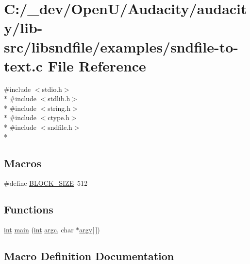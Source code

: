 \hypertarget{sndfile-to-text_8c}{}\section{C\+:/\+\_\+dev/\+Open\+U/\+Audacity/audacity/lib-\/src/libsndfile/examples/sndfile-\/to-\/text.c File Reference}
\label{sndfile-to-text_8c}
{\ttfamily \#include $<$stdio.\+h$>$}\\*
{\ttfamily \#include $<$stdlib.\+h$>$}\\*
{\ttfamily \#include $<$string.\+h$>$}\\*
{\ttfamily \#include $<$ctype.\+h$>$}\\*
{\ttfamily \#include $<$sndfile.\+h$>$}\\*
\subsection*{Macros}
\begin{DoxyCompactItemize}
\item 
\#define \hyperlink{sndfile-to-text_8c_ad51ded0bbd705f02f73fc60c0b721ced}{B\+L\+O\+C\+K\+\_\+\+S\+I\+ZE}~512
\end{DoxyCompactItemize}
\subsection*{Functions}
\begin{DoxyCompactItemize}
\item 
\hyperlink{xmltok_8h_a5a0d4a5641ce434f1d23533f2b2e6653}{int} \hyperlink{sndfile-to-text_8c_a0ddf1224851353fc92bfbff6f499fa97}{main} (\hyperlink{xmltok_8h_a5a0d4a5641ce434f1d23533f2b2e6653}{int} \hyperlink{cmdline_8c_aaffeb1bf2056ea44af5b5d0ee4d6ff07}{argc}, char $\ast$\hyperlink{cmdline_8c_ad407d5ba91709bd9b092003858600723}{argv}\mbox{[}$\,$\mbox{]})
\end{DoxyCompactItemize}


\subsection{Macro Definition Documentation}
